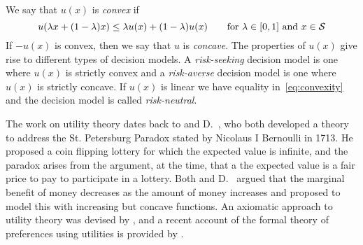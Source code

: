 \documentclass[main.tex]{subfiles}
\begin{document}
\begin{mydef}[Convexity]
  We say that $u(x)$ is \emph{convex} if
  \begin{equation}\label{eq:convexity}
    u(\lambda x + (1-\lambda)x)\leq
    \lambda u(x) + (1-\lambda) u(x)\qquad \textnormal{for $\lambda\in[0,1]$ and
      $x\in\mathcal{S}$}
  \end{equation}
  If $-u(x)$ is convex, then we say that $u$ is
  \emph{concave}.
  The properties of $u(x)$ give rise to different types of decision models.
  A \emph{risk-seeking} decision model is one where $u(x)$
  is strictly convex and a \emph{risk-averse} decision model is one where
  $u(x)$ is strictly concave.
  If $u(x)$ is linear we have equality in~\eqref{eq:convexity} and
  the decision model is called \emph{risk-neutral}.
\end{mydef}

The work on utility theory dates back to \citet{cramer1728utility} and
D.~\citet{bernoulli1738specimen}, who both developed a theory
to address the St. Petersburg Paradox stated by Nicolaus I Bernoulli
in 1713. He proposed a coin flipping lottery for which the
expected value is infinite, and the paradox arises from the
argument, at the time, that a the expected value is a fair price to
pay to participate in a lottery.
Both \citeauthor{cramer1728utility} and
D.~\citeauthor{bernoulli1738specimen} argued that the marginal benefit
of money decreases as the amount of money increases and proposed to
model this with increasing but concave functions.
An axiomatic approach to utility theory was devised by
\citet{neumann1953theory}, and
a recent account of the formal theory of preferences using utilities
is provided by \citet[Ch.~2]{follmer2004stochastic}.
\end{document}
